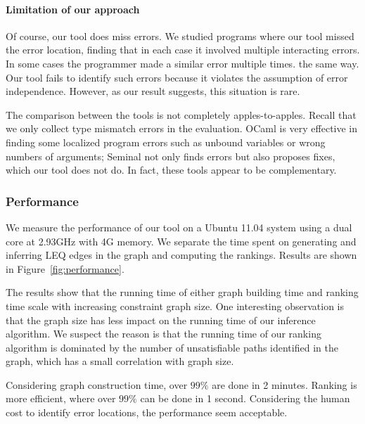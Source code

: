 \paragraph{Limitation of our approach}
Of course, our tool does miss errors. We studied
programs where our tool missed the error location, finding that
in each case it involved multiple interacting errors. In some cases
the programmer made a similar error multiple times.
the same way. Our tool fails to identify such errors because
it violates the assumption of error independence.
However, as our result suggests, this situation is rare.

The comparison between the tools is not completely apples-to-apples.
Recall that we only collect type mismatch errors in the evaluation.
OCaml is very effective in finding some localized program errors such as
unbound variables or wrong numbers of arguments; Seminal not only
finds errors but also proposes fixes, which our tool does not do.
In fact, these tools appear to be complementary.


\subsubsection{Performance}

We measure the performance of
our tool on a Ubuntu 11.04 system using a dual core at 2.93GHz with 4G
memory. We separate the time spent on generating and inferring LEQ
edges in the graph and computing the rankings. Results are shown in
Figure~\ref{fig:performance}.

The results show that the running time of either graph building
time and ranking time scale with increasing constraint graph
size. One interesting observation is that the graph size has less
impact on the running time of our inference algorithm. We suspect the
reason is that the running time of our ranking algorithm is
dominated by the number of unsatisfiable paths identified in the graph,
which has a small correlation with graph size.

Considering graph construction time, over $99\%$ are done in 2
minutes.  Ranking is more efficient, where over $99\%$ can be done in
1 second.  Considering the human cost to identify error locations, the
performance seem acceptable.

